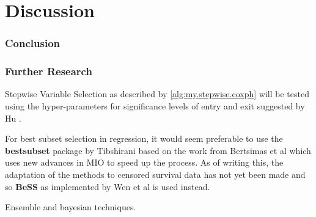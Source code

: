 \newpage
\part{Discussion}
\section{Conclusion}

\section{Further Research}

Stepwise Variable Selection as described by \cref{alg:my.stepwise.coxph} will be tested using the hyper-parameters for significance levels of entry and exit suggested by Hu .

For best subset selection in regression, it would seem preferable to use the \textbf{bestsubset} package by Tibshirani  based on the work from Bertsimas et al  which uses new advances in MIO to speed up the process. As of writing this, the adaptation of the methods to censored survival data has not yet been made and so \textbf{BeSS} as implemented by Wen et al  is used instead.

Ensemble and bayesian techniques.